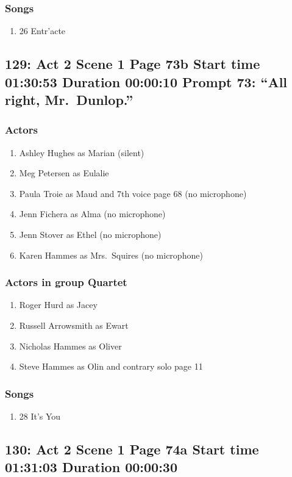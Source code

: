 \subsubsection{Songs}
\begin{enumerate}
\item 26 Entr'acte
\end{enumerate}
\subsection{129: Act 2 Scene 1 Page 73b Start time 01:30:53 Duration 00:00:10 Prompt 73: ``All right, Mr.~Dunlop.''}

\subsubsection{Actors}
\begin{enumerate}
\item Ashley Hughes as Marian (silent)
\item Meg Petersen as Eulalie
\item Paula Troie as Maud and 7th voice page 68 (no microphone)
\item Jenn Fichera as Alma (no microphone)
\item Jenn Stover as Ethel (no microphone)
\item Karen Hammes as Mrs.~Squires (no microphone)
\end{enumerate}
\subsubsection{Actors in group Quartet}
\begin{enumerate}
\item Roger Hurd as Jacey
\item Russell Arrowsmith as Ewart
\item Nicholas Hammes as Oliver
\item Steve Hammes as Olin and contrary solo page 11
\end{enumerate}

\subsubsection{Songs}
\begin{enumerate}
\item 28 It's You
\end{enumerate}
\subsection{130: Act 2 Scene 1 Page 74a Start time 01:31:03 Duration 00:00:30}

